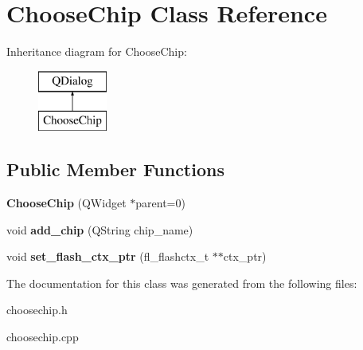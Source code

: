 \hypertarget{classChooseChip}{\section{Choose\-Chip Class Reference}
\label{classChooseChip}
}
Inheritance diagram for Choose\-Chip\-:\begin{figure}[H]
\begin{center}
\leavevmode
\includegraphics[height=2.000000cm]{classChooseChip}
\end{center}
\end{figure}
\subsection*{Public Member Functions}
\begin{DoxyCompactItemize}
\item 
\hypertarget{classChooseChip_a86433ee7ca248b75b72cdee5c484cc31}{{\bfseries Choose\-Chip} (Q\-Widget $\ast$parent=0)}\label{classChooseChip_a86433ee7ca248b75b72cdee5c484cc31}

\item 
\hypertarget{classChooseChip_a07ac26f7b12d03e8c8dd04f1dfd24c58}{void {\bfseries add\-\_\-chip} (Q\-String chip\-\_\-name)}\label{classChooseChip_a07ac26f7b12d03e8c8dd04f1dfd24c58}

\item 
\hypertarget{classChooseChip_ae34f2a29b05ff8cbb6acc6b72d841370}{void {\bfseries set\-\_\-flash\-\_\-ctx\-\_\-ptr} (fl\-\_\-flashctx\-\_\-t $\ast$$\ast$ctx\-\_\-ptr)}\label{classChooseChip_ae34f2a29b05ff8cbb6acc6b72d841370}

\end{DoxyCompactItemize}


The documentation for this class was generated from the following files\-:\begin{DoxyCompactItemize}
\item 
choosechip.\-h\item 
choosechip.\-cpp\end{DoxyCompactItemize}
